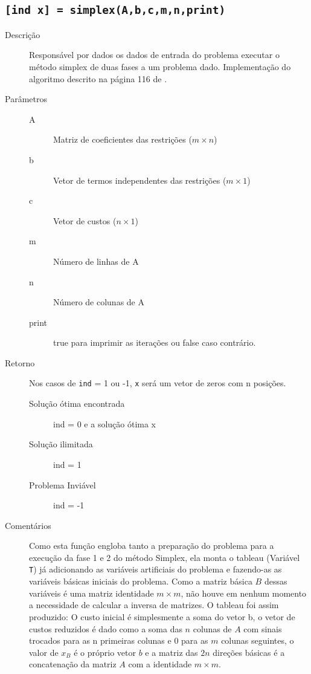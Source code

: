 \documentclass[brazil,times]{abnt}
\begin{document}
\subsection*{\texttt{[ind x] = simplex(A,b,c,m,n,print)}}
\begin{description}
	\item[Descrição] Responsável por dados os dados de entrada do problema executar o método simplex de duas fases a um problema dado. Implementação do algoritmo descrito na página 116 de \cite{Bertsimas:1997:ILO:548834}.
	\item[Parâmetros] 
		\begin{description}
		 \item[A] Matriz de coeficientes das restrições ($m \times n$)
		 \item[b] Vetor de termos independentes das restrições ($m \times 1$)
		 \item[c] Vetor de custos ($n \times 1$)
		 \item[m] Número de linhas de A
		 \item[n] Número de colunas de A
		 \item[print] true para imprimir as iterações ou false caso contrário.
		\end{description}
	\item[Retorno]
		Nos casos de \texttt{ind} = 1 ou -1, \texttt{x} será um vetor de zeros com n posições.
		\begin{description}
		 \item[Solução ótima encontrada] ind = 0 e a solução ótima x
		 \item[Solução ilimitada] ind = 1
		 \item[Problema Inviável] ind = -1
		\end{description}
	\item[Comentários] Como esta função engloba tanto a preparação do problema para a execução da fase 1 e 2 do método Simplex, ela monta o tableau (Variável \texttt{T}) já adicionando as variáveis artificiais do problema e fazendo-as as variáveis básicas iniciais do problema. Como a matriz básica $B$ dessas variáveis é uma matriz identidade $m \times m$, não houve em nenhum momento a necessidade de calcular a inversa de matrizes. O tableau foi assim produzido: O custo inicial é simplesmente a soma do vetor b, o vetor de custos reduzidos é dado como a soma das $n$ colunas de $A$ com sinais trocados para as n primeiras colunas e 0 para as $m$ colunas seguintes, o valor de $x_B$ é o próprio vetor $b$ e a matriz das $2n$ direções básicas é a concatenação da matriz $A$ com a identidade $m \times m$.
\end{description}
\end{document}

